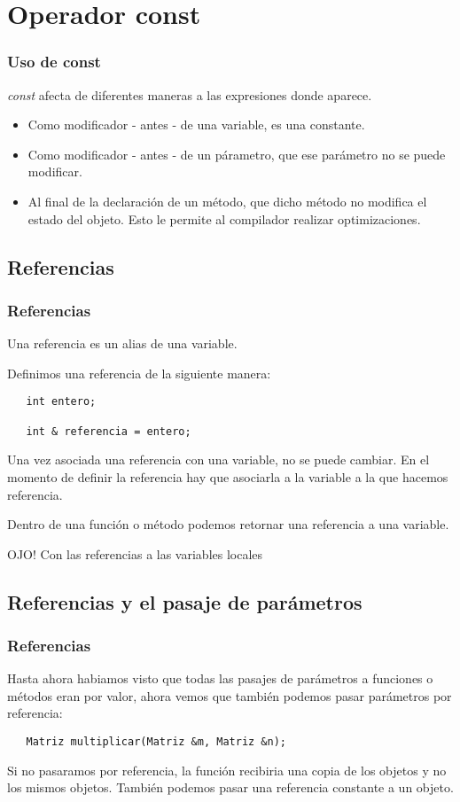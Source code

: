 \documentclass{beamer}
\begin{document}
\section{Operador const}
\begin{frame}
\frametitle{Uso de const}
  \emph{const} afecta de diferentes maneras a las expresiones donde aparece.

\begin{itemize}
 \item Como modificador - antes - de una variable, es una constante.
 \item Como modificador - antes - de un párametro, que ese parámetro no se puede modificar.

 \item Al final de la declaración de un método, que dicho método no modifica el estado del objeto. Esto le permite al compilador realizar optimizaciones.
\end{itemize}
\end{frame}

\subsection{Referencias}
\begin{frame}[fragile]
\frametitle{Referencias}
  
 Una referencia es un alias de una variable.

 Definimos una referencia de la siguiente manera:

\begin{verbatim}
   int entero;

   int & referencia = entero;
\end{verbatim}

Una vez asociada una referencia con una variable, no se puede cambiar. En el momento de definir la referencia hay que asociarla a la variable a la que hacemos referencia.

Dentro de una función o método podemos retornar una referencia a una variable.


\begin{block}{OJO!}
Con las referencias a las variables locales
\end{block}

\end{frame}

\subsection{Referencias y el pasaje de parámetros}
\begin{frame}[fragile]
\frametitle{Referencias}

Hasta ahora habiamos visto que todas las pasajes de parámetros a funciones o métodos eran por valor, ahora vemos que también podemos pasar parámetros por referencia:

\begin{verbatim}
   Matriz multiplicar(Matriz &m, Matriz &n);
\end{verbatim}
Si no pasaramos por referencia, la función recibiria una copia de los objetos y no los mismos objetos.
También podemos pasar una referencia constante a un objeto.
\end{frame}
\end{document}
